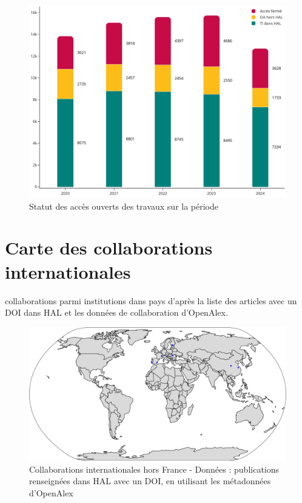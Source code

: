 \documentclass[french, 11pt]{dibiso/biso}
\begin{document}
\begin{figure}[!h]
  \includegraphics[width=\textwidth]{figures/open_access_works.pdf}
  \caption{Statut des accès ouverts des travaux sur la période {\oaworksperiod}}
  \label{fig_open_access_works}
\end{figure}







\pagebreak

\section{Carte des collaborations internationales}

{\collaborationsnb} collaborations parmi {\institutionsnb} institutions dans {\countriesnb} pays d'après la liste des articles avec un DOI dans HAL et les données de collaboration d'OpenAlex.

\begin{figure}[!h]
  \hspace{-.1\textwidth}\includegraphics[width=1.2\textwidth]{figures/collaboration_map_world.pdf}
  \caption{Collaborations internationales hors France - Données : publications renseignées dans HAL avec un DOI, en utilisant les métadonnées d'OpenAlex}
  \label{fig_collab_map}
\end{figure}
\end{document}
